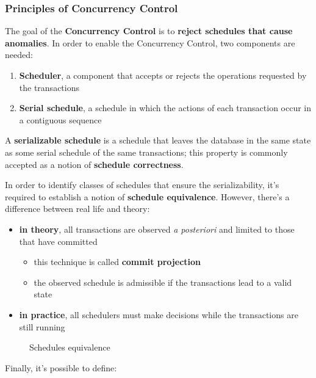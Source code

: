 \documentclass[english]{article}
\begin{document}
\subsubsection{Principles of Concurrency Control}

The goal of the \textbf{Concurrency Control} is to \textbf{reject schedules that cause anomalies}.
In order to enable the Concurrency Control, two components are needed:

\begin{enumerate}
  \item \textbf{Scheduler}, a component that accepts or rejects the operations requested by the transactions
  \item \textbf{Serial schedule}, a schedule in which the actions of each transaction occur in a contiguous sequence
\end{enumerate}

\bigskip
A \textbf{serializable schedule} is a schedule that leaves the database in the same state as some serial schedule of the same transactions;
this property is commonly accepted as a notion of \textbf{schedule correctness}.

In order to identify classes of schedules that ensure the serializability, it's required to establish a notion of \textbf{schedule equivalence}.
However, there's a difference between real life and theory:

\begin{itemize}
  \item \textbf{in theory}, all transactions are observed \textit{a posteriori} and limited to those that have committed
        \begin{itemize}
          \item this technique is called \textbf{commit projection}
          \item the observed schedule is admissible if the transactions lead to a valid state
        \end{itemize}
  \item \textbf{in practice}, all schedulers must make decisions while the transactions are still running
\end{itemize}

\begin{figure}[htbp]
  \bigskip
  \centering
  \caption{Schedules equivalence}
  \label{fig:schedules-equivalence}
  \bigskip
\end{figure}

Finally, it's possible to define:
\end{document}
